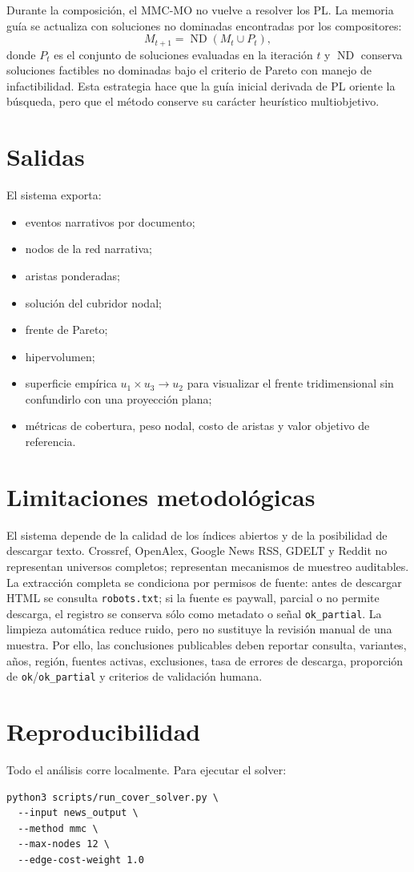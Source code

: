 \documentclass[11pt]{article}
\begin{document}
Durante la composición, el MMC-MO no vuelve a resolver los PL. La memoria guía
se actualiza con soluciones no dominadas encontradas por los compositores:
\[
M_{t+1}=\operatorname{ND}(M_t\cup P_t),
\]
donde \(P_t\) es el conjunto de soluciones evaluadas en la iteración \(t\) y
\(\operatorname{ND}\) conserva soluciones factibles no dominadas bajo el criterio
de Pareto con manejo de infactibilidad. Esta estrategia hace que la guía inicial
derivada de PL oriente la búsqueda, pero que el método conserve su carácter
heurístico multiobjetivo.

\section{Salidas}

El sistema exporta:

\begin{itemize}
  \item eventos narrativos por documento;
  \item nodos de la red narrativa;
  \item aristas ponderadas;
  \item solución del cubridor nodal;
  \item frente de Pareto;
  \item hipervolumen;
  \item superficie empírica \(u_1\times u_3\to u_2\) para visualizar el frente
  tridimensional sin confundirlo con una proyección plana;
  \item métricas de cobertura, peso nodal, costo de aristas y valor objetivo de referencia.
\end{itemize}

\section{Limitaciones metodológicas}

El sistema depende de la calidad de los índices abiertos y de la posibilidad de
descargar texto. Crossref, OpenAlex, Google News RSS, GDELT y Reddit no
representan universos completos; representan mecanismos de muestreo auditables.
La extracción completa se condiciona por permisos de fuente: antes de descargar
HTML se consulta \texttt{robots.txt}; si la fuente es paywall, parcial o no
permite descarga, el registro se conserva sólo como metadato o señal
\texttt{ok\_partial}. La limpieza automática reduce ruido, pero no sustituye la
revisión manual de una muestra. Por ello, las conclusiones publicables deben
reportar consulta, variantes, años, región, fuentes activas, exclusiones, tasa
de errores de descarga, proporción de \texttt{ok}/\texttt{ok\_partial} y criterios
de validación humana.

\section{Reproducibilidad}

Todo el análisis corre localmente. Para ejecutar el solver:

\begin{verbatim}
python3 scripts/run_cover_solver.py \
  --input news_output \
  --method mmc \
  --max-nodes 12 \
  --edge-cost-weight 1.0
\end{verbatim}


\end{document}
